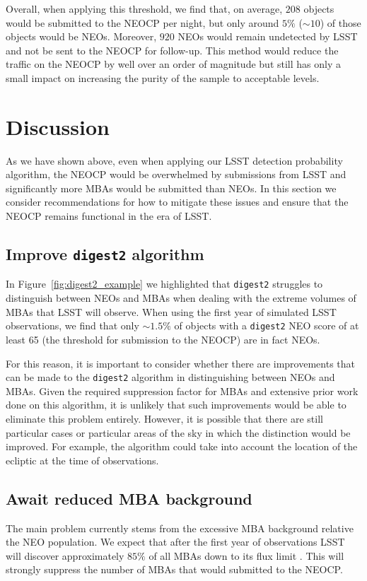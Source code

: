 \documentclass[twocolumn]{aastex631}
\newcommand{\dig}{\texttt{digest2}}
\newcommand{\npernightAlg}{208}
\newcommand{\purityAlg}{5}
\newcommand{\purityAlgRaw}{10}
\newcommand{\neoLostAlg}{920}
\begin{document}
Overall, when applying this threshold, we find that, on average, $\npernightAlg{}$ objects would be submitted to the NEOCP per night, but only around $\purityAlg{}\%$ (${\sim}\purityAlgRaw{}$) of those objects would be NEOs. Moreover, $\neoLostAlg{}$ NEOs would remain undetected by LSST and not be sent to the NEOCP for follow-up. This method would reduce the traffic on the NEOCP by well over an order of magnitude but still has only a small impact on increasing the purity of the sample to acceptable levels.

\section{Discussion} \label{sec:discussion}
As we have shown above, even when applying our LSST detection probability algorithm, the NEOCP would be overwhelmed by submissions from LSST and significantly more MBAs would be submitted than NEOs. In this section we consider recommendations for how to mitigate these issues and ensure that the NEOCP remains functional in the era of LSST.

\subsection{Improve \dig{} algorithm}
In Figure~\ref{fig:digest2_example} we highlighted that \dig{} struggles to distinguish between NEOs and MBAs when dealing with the extreme volumes of MBAs that LSST will observe. When using the first year of simulated LSST observations, we find that only ${\sim}1.5\%$ of objects with a \dig{} NEO score of at least 65 (the threshold for submission to the NEOCP) are in fact NEOs.

For this reason, it is important to consider whether there are improvements that can be made to the \dig{} algorithm in distinguishing between NEOs and MBAs. Given the required suppression factor for MBAs and extensive prior work done on this algorithm, it is unlikely that such improvements would be able to eliminate this problem entirely. However, it is possible that there are still particular cases or particular areas of the sky in which the distinction would be improved. For example, the algorithm could take into account the location of the ecliptic at the time of observations.

\subsection{Await reduced MBA background}
The main problem currently stems from the excessive MBA background relative the NEO population. We expect that after the first year of observations LSST will discover approximately $85\%$ of all MBAs down to its flux limit \citep{Juric+2020}. This will strongly suppress the number of MBAs that would submitted to the NEOCP.
\end{document}
